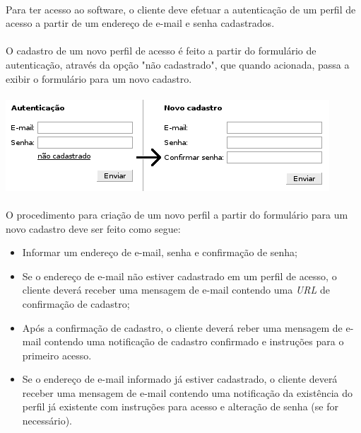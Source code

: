 \documentclass[a4paper,12pt]{article}
\begin{document}
\paragraph{}
Para ter acesso ao software, o cliente deve efetuar a autenticação de um perfil de acesso a partir de um endereço de e-mail e senha cadastrados.
\paragraph{}
O cadastro de um novo perfil de acesso é feito a partir do formulário de autenticação, através da opção "não cadastrado", que quando acionada, passa a exibir o formulário para um novo cadastro. 
\paragraph{}
\begin{center}
\includegraphics[scale=0.8]{authform.png}
\end{center}
\paragraph{}
O procedimento para criação de um novo perfil a partir do formulário para um novo cadastro deve ser feito como segue:
\begin{itemize}
\item Informar um endereço de e-mail, senha e confirmação de senha;
\item Se o endereço de e-mail não estiver cadastrado em um perfil de acesso, o cliente deverá receber uma mensagem de e-mail contendo uma \emph{URL} de confirmação de cadastro;
\item Após a confirmação de cadastro, o cliente deverá reber uma mensagem de e-mail contendo uma notificação de cadastro confirmado e instruções para o primeiro acesso.
\item Se o endereço de e-mail informado já estiver cadastrado, o cliente deverá receber uma mensagem de e-mail contendo uma notificação da existência do perfil já existente com instruções para acesso e alteração de senha (se for necessário).
\end{itemize}
\end{document}
